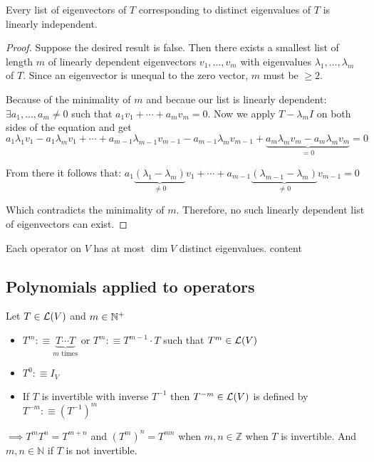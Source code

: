 \setcounter{thm}{10}
\begin{thm}
    Every list of eigenvectors of $T$ corresponding to distinct eigenvalues of $T$ is linearly independent.
\end{thm}
\begin{proof}
    Suppose the desired result is false. Then there exists a smallest list of length $m$ of linearly dependent eigenvectors $v_1, \dots, v_m$ with eigenvalues $\lambda_1, \dots, \lambda_m$ of $T$. Since an eigenvector is unequal to the zero vector, $m$ must be $\geq 2$.

    Because of the minimality of $m$ and becaue our list is linearly dependent: $\exists a_1, \dots, a_m \neq 0$ such that $a_1 v_1 + \cdots + a_m v_m = 0$. Now we apply $T-\lambda_m I$ on both sides of the equation and get
    $a_1 \lambda_1 v_1 - a_1 \lambda_m v_1 + \cdots +
    a_{m-1} \lambda_{m-1} v_{m-1} - a_{m-1} \lambda_{m} v_{m-1} +
    \underbrace{a_m \lambda_m v_m -a_m \lambda_m v_m}_{=0}=0$

    From there it follows that:
   $a_1 \underbrace{(\lambda_1 - \lambda_m)}_{\neq 0} v_1 + \cdots + a_{m-1} \underbrace{(\lambda_{m-1}-\lambda_{m})}_{\neq 0} v_{m-1}=0$

   Which contradicts the minimality of $m$. Therefore, no such linearly dependent list of eigenvectors can exist.
\end{proof}

\begin{thm}
    Each operator on $V$ has at most $\dim V$ distinct eigenvalues.
    content
\end{thm}

\paragraph{}

\subsection{Polynomials applied to operators}

\setcounter{thm}{12}
\begin{mydef}
    Let $T \in \mathcal{L}(V)$ and $m\in \mathbb{N}^{+}$
    \begin{itemize}
        \item $T^{m} :\equiv \underbrace{T \cdots T}_{\text{$m$ times}}$ or $T^{m} :\equiv T^{m-1} \cdot T$ such that $T^{m} \in \mathcal{L}(V)$
        \item $T^0 :\equiv I_V$
        \item If $T$ is invertible with inverse $T^{-1}$ then $T^{-m}\in \mathcal{L}(V)$ is defined by $T^{-m} :\equiv (T^{-1})^m$
    \end{itemize}
\end{mydef}
$\implies T^m T^n = T^{m+n}$ and $(T^m)^n=T^{mn}$ when $m,n \in \mathbb{Z}$ when $T$ is invertible. And $m,n \in \mathbb{N}$ if $T$ is not invertible.

